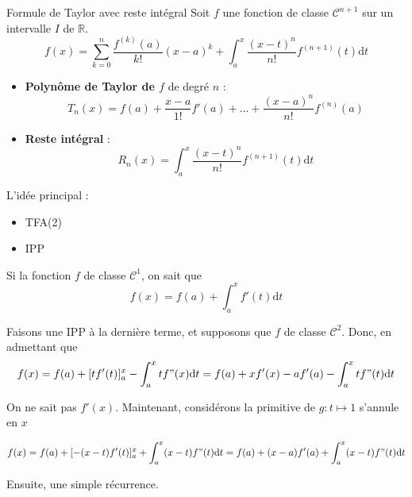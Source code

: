 \begin{Theorem}{Formule de Taylor avec reste intégral}{}
Soit $f$ une fonction de classe $\mathscr{C} ^{n+1}$ sur un intervalle $I$ de $\mathbb{R}$. 
\begin{equation}
  f(x) = \sum_{k=0}^{n} \frac{f ^{(k)}(a)}{k!} (x-a) ^{k} + \int_{a}^{x} \frac{(x-t) ^{n}
  }{n!}  f ^{(n+1)}(t) \mathrm{d}t
\end{equation}

\begin{itemize}

    \item \textbf{Polynôme de Taylor de $f$} de degré $n$ : 
      \begin{equation}
        T_n(x) = f(a) + \frac{x-a}{1!} f'(a) + \dots + \frac{(x-a) ^{n}}{n!} f ^{(n)}(a)
      \end{equation}

    \item \textbf{Reste intégral} : 
      \begin{equation}
        R_n(x) = \int_{
          a
        }^{x} \frac{(x-t) ^{n}}{n!} f ^{(n+1)} (t) \mathrm{d} t
      \end{equation}
\end{itemize}
\end{Theorem}

  \begin{note}{}{}
 L'idée principal : 
 \begin{itemize}

     \item TFA(2)
    \item IPP

 \end{itemize}
  \end{note}
\begin{myproof}{}{}


  

Si la fonction $f$ de classe $\mathscr{C} ^{1}$, on sait que 
\begin{equation}
  f(x) = f(a) + \int_{a}^{x} f'(t) \mathrm{d} t
\end{equation}

Faisons une IPP à la dernière terme, et supposons que $f$ de classe $\mathscr{C} ^{2}$. Donc, en admettant que 
\begin{equation}
  f(x) = f(a) + [tf'(t)] _a ^{x} - \int_{a}^{x} tf"(x) \mathrm{d}t = f(a) + xf'(x) - af'(a) - \int_{a}^{x} tf"(t) \mathrm{d}t
\end{equation}

On ne sait pas $f'(x)$. Maintenant, considérons la primitive de $g : t \mapsto 1$ s'annule en $x$

\begin{equation}
  f(x) = f(a) + [-(x-t)f'(t)] _a ^{x} + \int_{a}^{x}(x-t) f"(t) \mathrm{d}t = f(a) + (x-a) f'(a) + \int_{a}^{x} (x-t) f"(t) \mathrm{d}t
\end{equation}

Ensuite, une simple récurrence.
\end{myproof}

